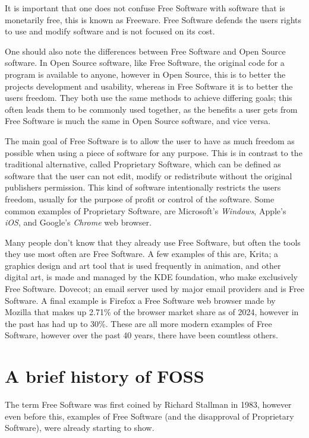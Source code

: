 \documentclass[a4paper,12pt]{article}
\begin{document}
{It is important that one does not confuse Free Software with software that is monetarily free, 
this is known as Freeware. Free Software defends the users rights to use and modify software and
is not focused on its cost.

One should also note the differences between Free Software and Open Source software. In Open Source
software, like Free Software, the original code for a program is available to anyone, however
in Open Source, this is to better the projects development and usability, whereas in Free Software
it is to better the users freedom. They both use the same methods to achieve differing goals; this
often leads them to be commonly used together, as the benefits a user gets from Free Software is 
much the same in Open Source software, and vice versa.

The main goal of Free Software is to allow the user to have as much freedom as possible when using 
a piece of software for any purpose. This is in contrast to the traditional alternative, called
Proprietary Software, which can be defined as software that the user can not edit, modify or 
redistribute without the original publishers permission. This kind of software intentionally 
restricts the users freedom, usually for the purpose of profit or control of the software. Some 
common examples of Proprietary Software, are Microsoft's \textit{Windows}, Apple's \textit{iOS}, 
and Google's \textit{Chrome} web browser.

Many people don't know that they already use Free Software\cite{COMMONfoss}, but often the tools
they use most often are Free Software. A few examples of this are, Krita\cite{KRITA}; a graphics 
design and art tool that is used frequently in animation, and other digital art, is made and 
managed by the KDE foundation\cite{KDE}, who make exclusively Free Software. Dovecot\cite{DOVECOT}; 
an email server used by major email providers and is Free Software. A final example is 
Firefox\cite{FIREFOX} a Free Software web browser made by Mozilla that makes up 2.71\% of the 
browser market share as of 2024, however in the past has had up to 30\%\cite{BROWSERmarketshare}. These 
are all more modern examples of Free Software, however over the past 40 years, there have 
been countless others. 

\section{A brief history of FOSS}
The term Free Software was first coined by Richard Stallman in 1983\cite{GNUproject}, however even
before this, examples of Free Software (and the disapproval of Proprietary Software), were already
starting to show. 

}
\end{document}
